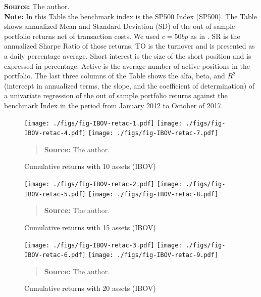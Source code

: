 \documentclass[12pt,oneside,a4paper]{memoir}
\begin{document}
\begin{table}[!ht]
\begin{threeparttable}
\begin{tablenotes} 
\textbf{Source:} The author. \\
\textbf{Note:}
In this Table the benchmark index is the SP500 Index (SP500).
The Table shows annualized Mean and Standard Deviation (SD) of the out of sample portfolio returns net of transaction costs.
We used $c=50bp$ as in .
SR is the annualized Sharpe Ratio of those returns.
TO is the turnover and is presented as a daily percentage average.
Short interest is the size of the short position and is expressed in percentage.
Active is the average number of active positions in the portfolio.
The last three columns of the Table shows the alfa, beta, and $R^2$ (intercept in annualized terms, the slope, and the coefficient of determination) of a univariate regression of the out of sample portfolio returns against the benchmark Index in the period from January 2012 to October of 2017.
\end{tablenotes} 

\end{threeparttable}
\end{table} 


\clearpage

\begin{figure}[htpb]
\centering
\footnotesize
\caption{Cumulative returns with 10 assets (IBOV)}
\label{fig:ibov:ret:10a}
\texttt{[image: ./figs/fig-IBOV-retac-1.pdf]}
\texttt{[image: ./figs/fig-IBOV-retac-4.pdf]}
\texttt{[image: ./figs/fig-IBOV-retac-7.pdf]}
\begin{quote}
\textbf{Source:} The author.
\end{quote}
\end{figure}

\begin{figure}[htpb]
\centering
\footnotesize
\caption{Cumulative returns with 15 assets (IBOV)}
\label{fig:ibov:ret:15a}
\texttt{[image: ./figs/fig-IBOV-retac-2.pdf]}
\texttt{[image: ./figs/fig-IBOV-retac-5.pdf]}
\texttt{[image: ./figs/fig-IBOV-retac-8.pdf]}
\begin{quote}
\textbf{Source:} The author.
\end{quote}
\end{figure}

\begin{figure}[htpb]
\centering
\footnotesize
\caption{Cumulative returns with 20 assets (IBOV)}
\label{fig:ibov:ret:20a}
\texttt{[image: ./figs/fig-IBOV-retac-3.pdf]}
\texttt{[image: ./figs/fig-IBOV-retac-6.pdf]}
\texttt{[image: ./figs/fig-IBOV-retac-9.pdf]}
\begin{quote}
\textbf{Source:} The author.
\end{quote}
\end{figure}
\end{document}
